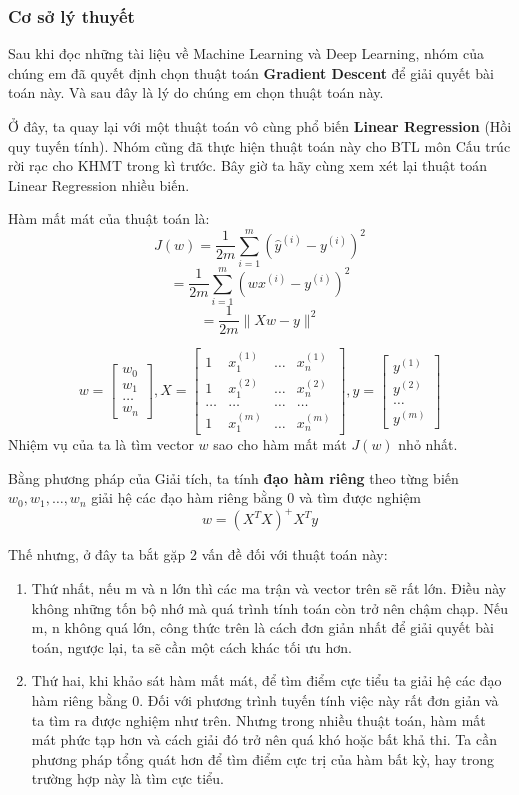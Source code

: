 \subsubsection{Cơ sở lý thuyết}
Sau khi đọc những tài liệu về Machine Learning và Deep Learning, nhóm của chúng em đã quyết định chọn thuật toán \textbf{Gradient Descent} để giải quyết bài toán này. Và sau đây là lý do chúng em chọn thuật toán này.

Ở đây, ta quay lại với một thuật toán vô cùng phổ biến \textbf{Linear Regression} (Hồi quy tuyến tính). Nhóm cũng đã thực hiện thuật toán này cho BTL môn Cấu trúc rời rạc cho KHMT trong kì trước. Bây giờ ta hãy cùng xem xét lại thuật toán Linear Regression nhiều biến.

Hàm mất mát của thuật toán là:
$$J(w) = \frac{1}{2m} \sum_{i=1}^{m} ( \widehat{y}^{(i)} - y^{(i)}) ^{2}$$
$$= \frac{1}{2m} \sum_{i=1}^{m} ( wx^{(i)} - y^{(i)}) ^{2}$$
$$= \frac{1}{2m} \parallel Xw - y \parallel ^{2}$$

$$w=\begin{bmatrix}w_{0} \\ w_{1} \\ … \\ w_{n} \end{bmatrix}, X= \begin{bmatrix}1 & x_{1}^{(1)} & … & x_{n}^{(1)} \\1 & x_{1}^{(2)} & … & x_{n}^{(2)} \\… & … & … & … \\1 & x_{1}^{(m)} & … & x_{n}^{(m)}\end{bmatrix}, y=\begin{bmatrix}y^{(1)} \\ y^{(2)} \\ … \\ y^{(m)} \end{bmatrix}$$
Nhiệm vụ của ta là tìm vector $w$ sao cho hàm mất mát $J(w)$ nhỏ nhất.

Bằng phương pháp của Giải tích, ta tính \textbf{đạo hàm riêng} theo từng biến $w_{0}, w_{1}, …, w_{n}$ giải hệ các đạo hàm riêng bằng 0 và tìm được nghiệm
$$w = (X^{T}X)^{+}X^{T}y$$

Thế nhưng, ở đây ta bắt gặp 2 vấn đề đối với thuật toán này:
\begin{enumerate}
    \item Thứ nhất, nếu m và n lớn thì các ma trận và vector trên sẽ rất lớn. Điều này không những tốn bộ nhớ mà quá trình tính toán còn trở nên chậm chạp. Nếu m, n không quá lớn, công thức trên là cách đơn giản nhất để giải quyết bài toán, ngược lại, ta sẽ cần một cách khác tối ưu hơn.
\item  Thứ hai, khi khảo sát hàm mất mát, để tìm điểm cực tiểu ta giải hệ các đạo hàm riêng bằng 0. Đối với phương trình tuyến tính việc này rất đơn giản và ta tìm ra được nghiệm như trên. Nhưng trong nhiều thuật toán, hàm mất mát phức tạp hơn và cách giải đó trở nên quá khó hoặc bất khả thi. Ta cần phương pháp tổng quát hơn để tìm điểm cực trị của hàm bất kỳ, hay trong trường hợp này là tìm cực tiểu.
\end{enumerate}

